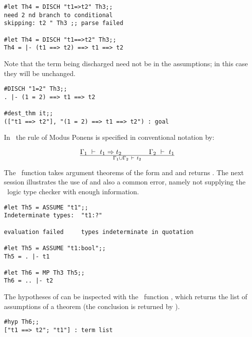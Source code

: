\begin{session}
\begin{verbatim}
#let Th4 = DISCH "t1=>t2" Th3;;
need 2 nd branch to conditional
skipping: t2 " Th3 ;; parse failed     

#let Th4 = DISCH "t1==>t2" Th3;;
Th4 = |- (t1 ==> t2) ==> t1 ==> t2
\end{verbatim}
\end{session}

\noindent Note that the term being discharged need not be in the assumptions; in
this case they will be unchanged.

\begin{session}\begin{verbatim}
#DISCH "1=2" Th3;;
. |- (1 = 2) ==> t1 ==> t2

#dest_thm it;;
(["t1 ==> t2"], "(1 = 2) ==> t1 ==> t2") : goal
\end{verbatim}\end{session}


In \HOL\,  the  rule    of  Modus  Ponens  is  specified in conventional
notation by:  

\[ \Gamma_1 \ \vdash\  t_1 \Rightarrow t_2 \qquad\qquad \Gamma_2\ \vdash\  t_1\over
\Gamma_1 \cup \Gamma_2 \ \vdash\  t_2\]

\noindent The \ML\ function  takes argument theorems of the
form  and 
and returns . The next session illustrates the use of
 and also a common error, namely not supplying the \HOL\ logic type
checker with enough information. 

\begin{session}\begin{verbatim}
#let Th5 = ASSUME "t1";;
Indeterminate types:  "t1:?"

evaluation failed     types indeterminate in quotation

#let Th5 = ASSUME "t1:bool";;
Th5 = . |- t1

#let Th6 = MP Th3 Th5;;
Th6 = .. |- t2
\end{verbatim}\end{session}

The hypotheses of  can be inspected with the \ML\ function ,
which returns the list of assumptions of a theorem (the conclusion is returned by
).

\begin{session}\begin{verbatim}
#hyp Th6;;
["t1 ==> t2"; "t1"] : term list
\end{verbatim}\end{session}

